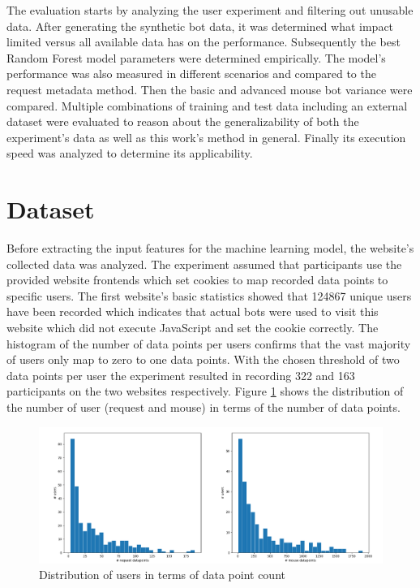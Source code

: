 \documentclass[
    fontsize=12pt,
    headings=small,
    parskip=half,           %
    bibliography=totoc,
    numbers=noenddot,       %
    open=any,               %
    final,                   %
    table
]{scrreprt}
\begin{document}
The evaluation starts by analyzing the user experiment and filtering out unusable data. After generating the synthetic bot data, it was determined what impact limited versus all available data has on the performance. Subsequently the best Random Forest model parameters were determined empirically. The model's performance was also measured in different scenarios and compared to the request metadata method. Then the basic and advanced mouse bot variance were compared. Multiple combinations of training and test data including an external dataset were evaluated to reason about the generalizability of both the experiment's data as well as this work's method in general. Finally its execution speed was analyzed to determine its applicability.

\section{Dataset}

Before extracting the input features for the machine learning model, the website's collected data was analyzed. The experiment assumed that participants use the provided website frontends which set cookies to map recorded data points to specific users. The first website's basic statistics showed that 124867 unique users have been recorded which indicates that actual bots were used to visit this website which did not execute JavaScript and set the cookie correctly. The histogram of the number of data points per users confirms that the vast majority of users only map to zero to one data points. With the chosen threshold of two data points per user the experiment resulted in recording 322 and 163 participants on the two websites respectively. Figure \ref{fig:user_dp_hist} shows the distribution of the number of user (request and mouse) in terms of the number of data points.

\begin{figure}[h]
    \includegraphics[width=\textwidth]{figures/user_dp_hist.png}
    \caption{Distribution of users in terms of data point count}
    \label{fig:user_dp_hist}
\end{figure}
\end{document}
